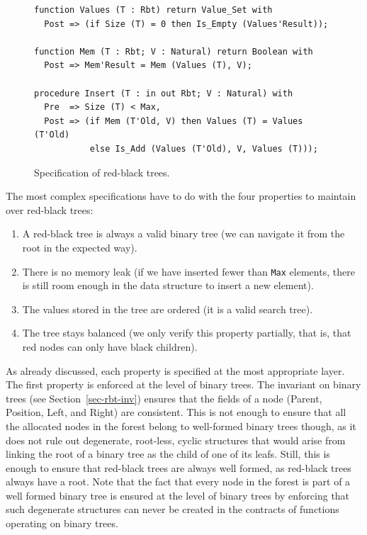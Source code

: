 \documentclass{llncs}
\begin{document}
\begin{figure}[ht]
\vspace{-0.5cm}
\begin{small}
\begin{lstlisting}
function Values (T : Rbt) return Value_Set with
  Post => (if Size (T) = 0 then Is_Empty (Values'Result));

function Mem (T : Rbt; V : Natural) return Boolean with
  Post => Mem'Result = Mem (Values (T), V);

procedure Insert (T : in out Rbt; V : Natural) with
  Pre  => Size (T) < Max,
  Post => (if Mem (T'Old, V) then Values (T) = Values (T'Old)
           else Is_Add (Values (T'Old), V, Values (T)));
\end{lstlisting}
\end{small}
\caption{\label{fig-rbt-spec} Specification of red-black trees.}
\vspace{-0.5cm}
\end{figure}

The most complex specifications have to do with the four properties to maintain
over red-black trees:
\begin{enumerate}
 \item A red-black tree is always a valid binary tree (we can navigate it from
   the root in the expected way).
 \item There is no memory leak (if we have inserted fewer than \texttt{Max}
   elements, there is still room enough in the data structure to insert a new
   element).
 \item The values stored in the tree are ordered (it is a valid search tree).
 \item The tree stays balanced (we only verify this property partially, that is, that red
   nodes can only have black children).
\end{enumerate}

As already discussed, each property is specified at the most appropriate layer.
The first property is enforced at the level of binary trees. The invariant on
binary trees (see Section~\ref{sec-rbt-inv}) ensures that the fields of a node
(Parent, Position, Left, and Right) are consistent. This is not enough to
ensure that all the allocated nodes in the forest belong to well-formed binary
trees though, as it does not rule out degenerate, root-less, cyclic structures
that would arise from linking the root of a binary tree as the child of one of
its leafs. Still, this is enough to ensure that red-black trees are always well
formed, as red-black trees always have a root. Note that the fact that every
node in the forest is part of a well formed binary tree is ensured at the level
of binary trees by enforcing that such degenerate structures can never be
created in the contracts of functions operating on binary trees.
\end{document}
